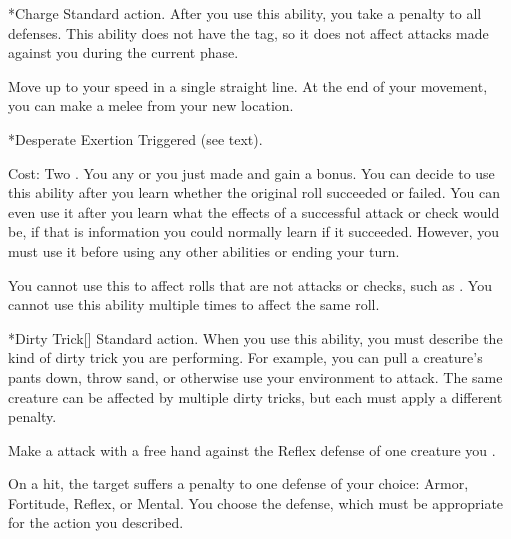         \begin{activeability}*{Charge}
            \abilityusagetime Standard action.
            \rankline
            After you use this ability, you  take a  penalty to all defenses.
            This ability does not have the  tag, so it does not affect attacks made against you during the current phase.

            Move up to your speed in a single straight line.
            At the end of your movement, you can make a melee  from your new location.
        \end{activeability}

        \begin{activeability}*{Desperate Exertion}
            \abilityusagetime Triggered (see text).
            \par \noindent Cost: Two .
            \rankline
            You  any  or  you just made and gain a  bonus.
            You can decide to use this ability after you learn whether the original roll succeeded or failed.
            You can even use it after you learn what the effects of a successful attack or check would be, if that is information you could normally learn if it succeeded.
            However, you must use it before using any other abilities or ending your turn.

            You cannot use this to affect rolls that are not attacks or checks, such as .
            You cannot use this ability multiple times to affect the same roll.
        \end{activeability}

        \begin{activeability}*{Dirty Trick}[]
            \abilityusagetime Standard action.
            \rankline
            When you use this ability, you must describe the kind of dirty trick you are performing.
            For example, you can pull a creature's pants down, throw sand, or otherwise use your environment to attack.
            The same creature can be affected by multiple dirty tricks, but each must apply a different penalty.

            Make a attack with a free hand against the Reflex defense of one creature you .

            On a hit, the target  suffers a  penalty to one defense of your choice: Armor, Fortitude, Reflex, or Mental.
            You choose the defense, which must be appropriate for the action you described.
        \end{activeability}

